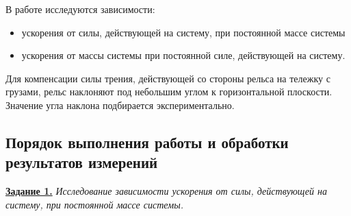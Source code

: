 \documentclass[a4paper, 12pt]{extarticle}
\begin{document}
В работе исследуются зависимости:
\begin{itemize}
\item ускорения от силы, действующей на систему, при постоянной массе системы
\item ускорения от массы системы при постоянной силе, действующей на систему. %
\end{itemize}

Для компенсации силы трения, действующей со стороны рельса на тележку с грузами, рельс наклоняют под небольшим углом к горизонтальной плоскости. Значение угла наклона подбирается экспериментально. 

\subsection{Порядок выполнения работы и обработки результатов измерений}
\underline{\textbf{Задание 1.}} \emph{Исследование зависимости ускорения от силы, действующей на систему, при постоянной массе системы.} %
\end{document}
